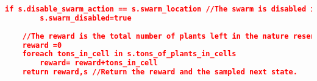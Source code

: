 \begin{lstlisting}[floatplacement=h,numbersymbol=$:$,language=json,caption={The Locusts Swarm domain in pseudo PPL code.},label={lst:LocustsDomain_PPL},basicstyle=\tiny]
    if s.disable_swarm_action == s.swarm_location //The swarm is disabled if the crop duster sprayed its last location.
        s.swarm_disabled=true
        
    //The reward is the total number of plants left in the nature reserve.
    reward =0
    foreach tons_in_cell in s.tons_of_plants_in_cells
        reward= reward+tons_in_cell
    return reward,s //Return the reward and the sampled next state.
\end{lstlisting}  